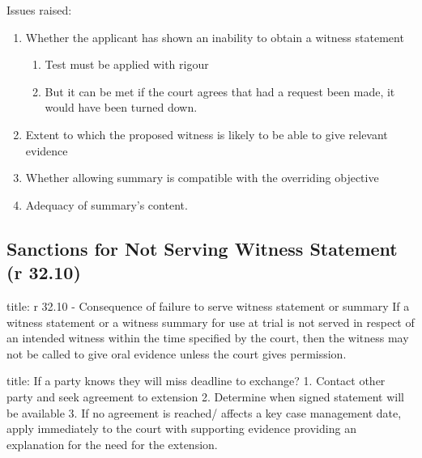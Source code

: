 \documentclass[
]{article}
\newenvironment{Shaded}{}{}
\newcommand{\NormalTok}[1]{#1}
\providecommand{\tightlist}{%
  \setlength{\itemsep}{0pt}\setlength{\parskip}{0pt}}
\begin{document}
Issues raised:

\begin{enumerate}
\def\labelenumi{\arabic{enumi}.}
\tightlist
\item
  Whether the applicant has shown an inability to obtain a witness
  statement

  \begin{enumerate}
  \def\labelenumii{\arabic{enumii}.}
  \tightlist
  \item
    Test must be applied with rigour
  \item
    But it can be met if the court agrees that had a request been made,
    it would have been turned down.
  \end{enumerate}
\item
  Extent to which the proposed witness is likely to be able to give
  relevant evidence
\item
  Whether allowing summary is compatible with the overriding objective
\item
  Adequacy of summary's content.
\end{enumerate}

\hypertarget{sanctions-for-not-serving-witness-statement-r-32.10}{%
\subsection{Sanctions for Not Serving Witness Statement (r
32.10)}\label{sanctions-for-not-serving-witness-statement-r-32.10}}

\begin{Shaded}
\begin{Highlighting}[]
\NormalTok{title: r 32.10 {-} Consequence of failure to serve witness statement or summary}
\NormalTok{If a witness statement or a witness summary for use at trial is not served in respect of an intended witness within the time specified by the court, then the witness may not be called to give oral evidence unless the court gives permission.}
\end{Highlighting}
\end{Shaded}

\begin{Shaded}
\begin{Highlighting}[]
\NormalTok{title: If a party knows they will miss deadline to exchange?}
\NormalTok{1. Contact other party and seek agreement to extension}
\NormalTok{2. Determine when signed statement will be available}
\NormalTok{3. If no agreement is reached/ affects a key case management date, apply immediately to the court with supporting evidence providing an explanation for the need for the extension. }
\end{Highlighting}
\end{Shaded}
\end{document}
